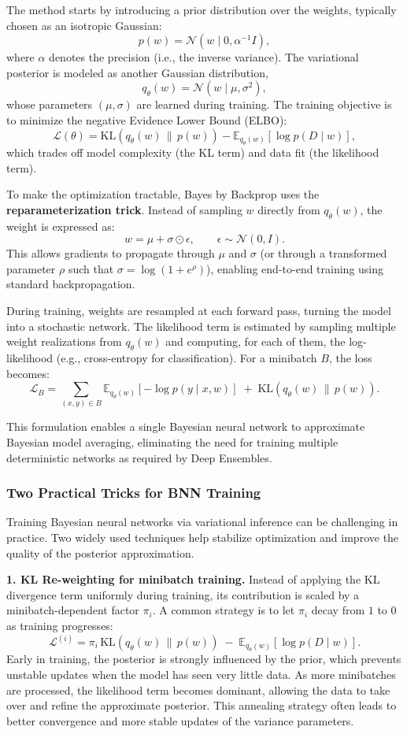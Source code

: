 The method starts by introducing a prior distribution over the weights, typically chosen as an isotropic Gaussian:
\[
p(w) = \mathcal{N}(w \mid 0, \alpha^{-1} I),
\]
where $\alpha$ denotes the precision (i.e., the inverse variance).  
The variational posterior is modeled as another Gaussian distribution,
\[
q_\theta(w) = \mathcal{N}(w \mid \mu, \sigma^2),
\]
whose parameters $(\mu, \sigma)$ are learned during training. The training objective is to minimize the negative Evidence Lower Bound (ELBO):
\[
\mathcal{L}(\theta) = \mathrm{KL}(q_\theta(w) \,\|\, p(w)) - 
\mathbb{E}_{q_\theta(w)}[\log p(D \mid w)],
\]
which trades off model complexity (the KL term) and data fit (the likelihood term).

To make the optimization tractable, Bayes by Backprop uses the \textbf{reparameterization trick}. Instead of sampling $w$ directly from $q_\theta(w)$, the weight is expressed as:
\[
w = \mu + \sigma \odot \epsilon, \qquad \epsilon \sim \mathcal{N}(0, I).
\]
This allows gradients to propagate through $\mu$ and $\sigma$ (or through a transformed parameter $\rho$ such that $\sigma = \log(1 + e^\rho)$), enabling end-to-end training using standard backpropagation.

During training, weights are resampled at each forward pass, turning the model into a stochastic network. The likelihood term is estimated by sampling multiple weight realizations from $q_\theta(w)$ and computing, for each of them, the log-likelihood (e.g., cross-entropy for classification). For a minibatch $B$, the loss becomes:
\[
\mathcal{L}_B = 
\sum_{(x,y) \in B}
\mathbb{E}_{q_\theta(w)}[-\log p(y \mid x, w)]
\;+\;
\mathrm{KL}(q_\theta(w) \,\|\, p(w)).
\]

This formulation enables a single Bayesian neural network to approximate Bayesian model averaging, eliminating the need for training multiple deterministic networks as required by Deep Ensembles.


\subsubsection{Two Practical Tricks for BNN Training}

Training Bayesian neural networks via variational inference can be challenging in practice. Two widely used techniques help stabilize optimization and improve the quality of the posterior approximation.

\textbf{1. KL Re-weighting for minibatch training.}  
Instead of applying the KL divergence term uniformly during training, its contribution is scaled by a minibatch-dependent factor $\pi_i$. A common strategy is to let $\pi_i$ decay from $1$ to $0$ as training progresses:
\[
\mathcal{L}^{(i)} = \pi_i \, \mathrm{KL}(q_\theta(w) \,\|\, p(w)) 
\;-\; 
\mathbb{E}_{q_\theta(w)}[\log p(D \mid w)].
\]
Early in training, the posterior is strongly influenced by the prior, which prevents unstable updates when the model has seen very little data. As more minibatches are processed, the likelihood term becomes dominant, allowing the data to take over and refine the approximate posterior. This annealing strategy often leads to better convergence and more stable updates of the variance parameters.

